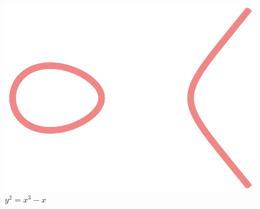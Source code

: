 \documentclass{beamer}
\begin{document}
\begin{frame}
\begin{figure}[H]
\begin{minipage}[b]{0.25\linewidth}
\caption{$y^2 = x^3 - x + 1$}
\label{fig:b}
\end{minipage}
\hspace{0.5cm}
\begin{minipage}[b]{0.25\linewidth}
\centering
\includegraphics[width=\textwidth]{ch2-first-curves-3.png}
\caption{$y^2 = x^3 - x$}
\label{fig:b}
\end{minipage}
\end{figure}
\end{frame}
\end{document}
